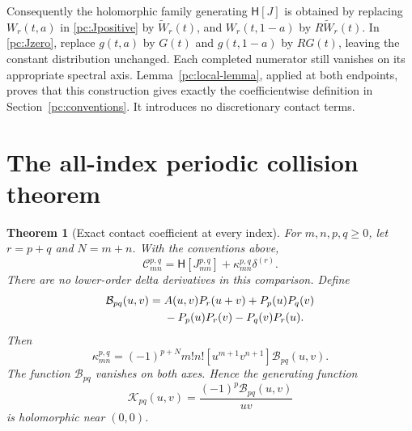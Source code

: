 \documentclass[11pt,a4paper]{article}
\numberwithin{equation}{section}
\newtheorem{theorem}{Theorem}[section]
\theoremstyle{definition}
\newcommand{\HH}{\mathsf H}
\newcommand{\CC}{\mathcal C}
\newcommand{\BF}{\mathcal B}
\newcommand{\JF}{\mathcal K}
\begin{document}
Consequently the holomorphic family generating $\HH[J]$ is obtained by replacing $W_r(t,a)$ in \eqref{pc:Jpositive} by $\widetilde W_r(t)$, and $W_r(t,1-a)$ by $R\widetilde W_r(t)$. In \eqref{pc:Jzero}, replace $g(t,a)$ by $G(t)$ and $g(t,1-a)$ by $RG(t)$, leaving the constant distribution unchanged. Each completed numerator still vanishes on its appropriate spectral axis. Lemma~\ref{pc:local-lemma}, applied at both endpoints, proves that this construction gives exactly the coefficientwise definition in Section~\ref{pc:conventions}. It introduces no discretionary contact terms.

\section{The all-index periodic collision theorem}\label{pc:main-section}
\begin{theorem}[Exact contact coefficient at every index]\label{pc:main}
For $m,n,p,q\ge0$, let $r=p+q$ and $N=m+n$. With the conventions above,
\begin{equation}\label{pc:main-identity}
\boxed{\quad
\CC_{mn}^{p,q}=\HH[J_{mn}^{p,q}]+\kappa_{mn}^{p,q}\delta^{(r)}.
\quad}
\end{equation}
There are no lower-order delta derivatives in this comparison. Define
\begin{align}
\BF_{pq}(u,v)={}&A(u,v)P_r(u+v)+P_p(u)P_q(v)\notag\\
&-P_p(u)P_r(v)-P_q(v)P_r(u).\label{pc:B}
\end{align}
Then
\begin{equation}\label{pc:kappa}
\boxed{\quad
\kappa_{mn}^{p,q}=(-1)^{p+N}m!n!
[u^{m+1}v^{n+1}]\BF_{pq}(u,v).
\quad}
\end{equation}
The function $\BF_{pq}$ vanishes on both axes. Hence the generating function
\begin{equation}\label{pc:Kgen}
\JF_{pq}(u,v)=\frac{(-1)^p\BF_{pq}(u,v)}{uv}
\end{equation}
is holomorphic near $(0,0)$.
\end{theorem}
\end{document}

